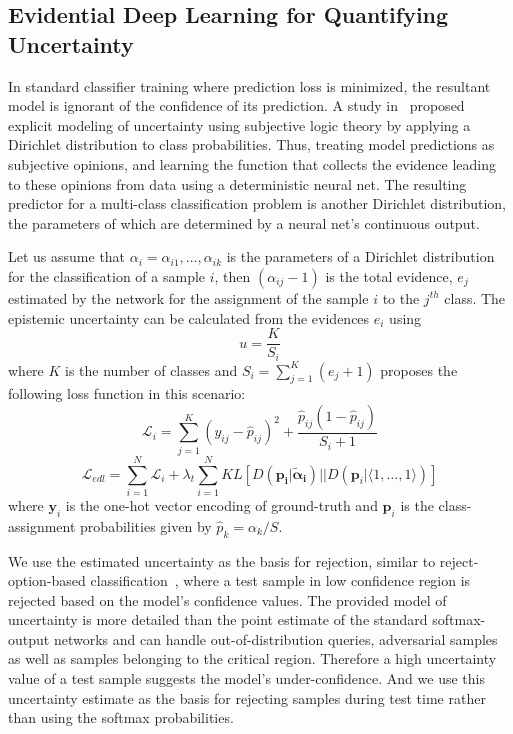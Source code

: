 \documentclass[runningheads]{llncs}
\begin{document}
\subsection{Evidential Deep Learning for Quantifying Uncertainty}
In standard classifier training where prediction loss is minimized, the resultant model is ignorant of the confidence of its prediction. A study in~\cite{edl} proposed explicit modeling of uncertainty using subjective logic theory by applying a Dirichlet distribution to class probabilities. Thus, treating model predictions as subjective opinions, and learning the function that collects the evidence leading to these opinions from data using a deterministic neural net. The resulting predictor for a multi-class classification problem is another Dirichlet distribution, the parameters of which are determined by a neural net's continuous output. 

Let us assume that $\alpha_i = \alpha_{i1},\ldots,\alpha_{ik}$ is the parameters of a Dirichlet distribution for the classification of a sample $i$, then $(\alpha_{ij} - 1)$ is the total evidence, $e_j$ estimated by the network for the assignment of the sample $i$ to the $j^{th}$ class. The epistemic uncertainty can be calculated from the evidences $e_i$ using 
\begin{equation}\label{eq:unc}
    u = \frac{K}{S_i}
\end{equation}
where $K$ is the number of classes and $S_i = \sum_{j=1}^{K}(e_j + 1)$
\cite{edl} proposes the following loss function in this scenario: 
\begin{equation}\label{eq:loss_i}
    \mathcal{L}_i = \sum_{j=1}^{K}(y_{ij}-\hat{p}_{ij})^2 + \frac{\hat{p}_{ij}(1-\hat{p}_{ij})}{S_i+1}
\end{equation}
\begin{equation}\label{eq:loss}
\mathcal{L}_{edl} = \sum_{i=1}^{N}\mathcal{L}_{i} + \lambda_{t}\sum_{i=1}^{N}KL[D(\boldsymbol{p_i|\tilde{\alpha}_i})||D(\boldsymbol{p}_i|\langle1,\dots,1\rangle)]
\end{equation}
where $\boldsymbol{y}_i$ is the one-hot vector encoding of ground-truth and $\boldsymbol{p}_i$ is the class-assignment probabilities given by $\hat{p}_k=\alpha_k/S$.

We use the estimated uncertainty as the basis for rejection, similar to reject-option-based classification~\cite{reject_option}, where a test sample in low confidence region is rejected based on the model's confidence values. The provided model of uncertainty is more detailed than the point estimate of the standard softmax-output networks and can handle out-of-distribution queries, adversarial samples as well as samples belonging to the critical region. Therefore a high uncertainty value of a test sample suggests the model's under-confidence. And we use this uncertainty estimate as the basis for rejecting samples during test time rather than using the softmax probabilities.
\end{document}
